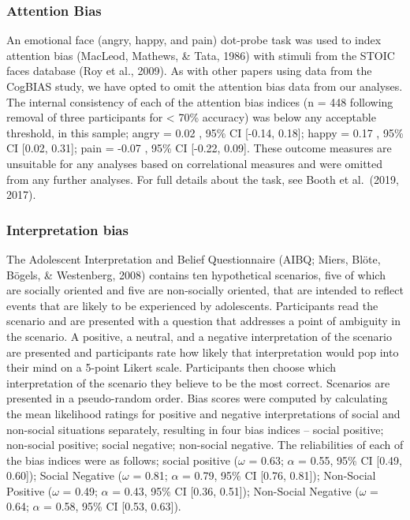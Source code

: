 \documentclass[man,floatsintext]{apa6}
\begin{document}
\hypertarget{attention-bias}{%
\subsubsection{Attention Bias}\label{attention-bias}}

An emotional face (angry, happy, and pain) dot-probe task was used to index attention bias (MacLeod, Mathews, \& Tata, 1986) with stimuli from the STOIC faces database (Roy et al., 2009). As with other papers using data from the CogBIAS study, we have opted to omit the attention bias data from our analyses. The internal consistency of each of the attention bias indices (n = 448 following removal of three participants for \textless{} 70\% accuracy) was below any acceptable threshold, in this sample; angry = 0.02 , 95\% CI {[}-0.14, 0.18{]}; happy = 0.17 , 95\% CI {[}0.02, 0.31{]}; pain = -0.07 , 95\% CI {[}-0.22, 0.09{]}. These outcome measures are unsuitable for any analyses based on correlational measures and were omitted from any further analyses. For full details about the task, see Booth et al.~(2019, 2017).

\hypertarget{interpretation-bias}{%
\subsubsection{Interpretation bias}\label{interpretation-bias}}

The Adolescent Interpretation and Belief Questionnaire (AIBQ; Miers, Blöte, Bögels, \& Westenberg, 2008) contains ten hypothetical scenarios, five of which are socially oriented and five are non-socially oriented, that are intended to reflect events that are likely to be experienced by adolescents. Participants read the scenario and are presented with a question that addresses a point of ambiguity in the scenario. A positive, a neutral, and a negative interpretation of the scenario are presented and participants rate how likely that interpretation would pop into their mind on a 5-point Likert scale. Participants then choose which interpretation of the scenario they believe to be the most correct. Scenarios are presented in a pseudo-random order. Bias scores were computed by calculating the mean likelihood ratings for positive and negative interpretations of social and non-social situations separately, resulting in four bias indices -- social positive; non-social positive; social negative; non-social negative. The reliabilities of each of the bias indices were as follows; social positive (\(\omega\) = 0.63; \(\alpha\) = 0.55, 95\% CI {[}0.49, 0.60{]}); Social Negative (\(\omega\) = 0.81; \(\alpha\) = 0.79, 95\% CI {[}0.76, 0.81{]}); Non-Social Positive (\(\omega\) = 0.49; \(\alpha\) = 0.43, 95\% CI {[}0.36, 0.51{]}); Non-Social Negative (\(\omega\) = 0.64; \(\alpha\) = 0.58, 95\% CI {[}0.53, 0.63{]}).
\end{document}
